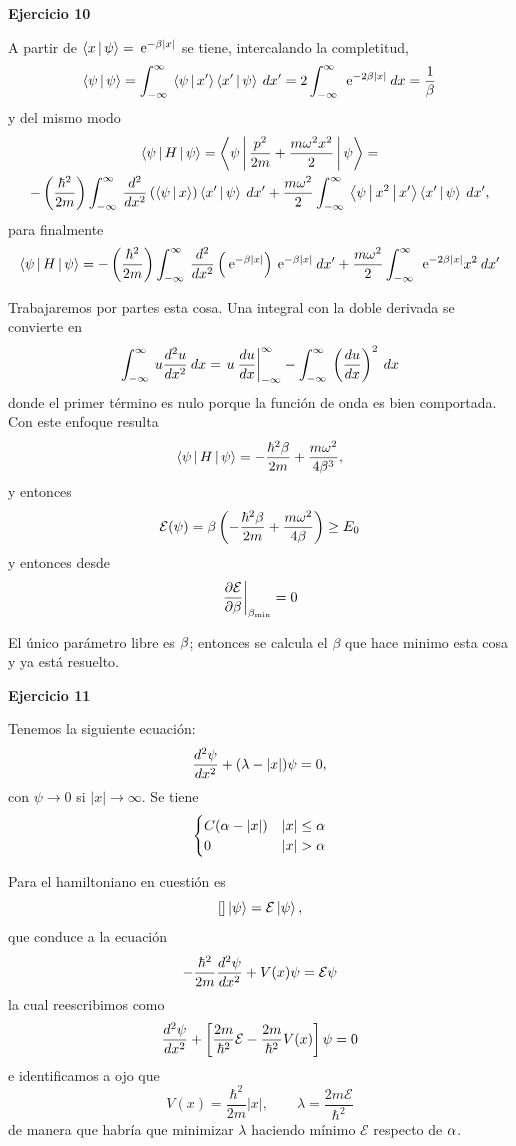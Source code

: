 \documentclass[10pt,oneside]{CBFT_book}
\begin{document}
\begin{ejemplo}{\bf Ejercicio 10}

A partir de $ \Braket{x|\psi} = \euler^{-\b|x|}$ se tiene, intercalando la completitud,
\[
	\Braket{\psi|\psi} = 
	\int_{-\infty}^\infty \: \Braket{\psi | x'}\Braket{x' | \psi} \: dx' = 
	2 \int_{-\infty}^\infty \: \euler^{- 2 \b |x| } \: dx = \frac{1}{\b}
\]
y del mismo modo
\begin{multline*}
	\Braket{\psi|H|\psi} = \Braket{\psi| \frac{p^2}{2 m} + \frac{m \omega^2 x^2 }{2} |\psi} = \\
	- \Frac{\hbar^2}{2m} \int_{-\infty}^\infty \: 
	\dtot[2]{}{x}\left( \Braket{\psi|x} \right)\Braket{x'|\psi} \: dx' +
	\frac{m\omega^2}{2} \int_{-\infty}^\infty \: \Braket{\psi|x^2|x'} \Braket{x'|\psi} \: dx',
\end{multline*}
para finalmente
\[
	\Braket{\psi|H|\psi} = - \Frac{\hbar^2}{2m} \int_{-\infty}^\infty \: 
	\dtot[2]{}{x}\left( \euler^{- \b |x| } \right) \euler^{- \b |x| } \: dx' +
	\frac{m\omega^2}{2} \int_{-\infty}^\infty \: \euler^{- 2 \b |x| } x^2 \: dx'
\]

Trabajaremos por partes esta cosa. Una integral con la doble derivada se convierte en
\[
	\int_{-\infty}^\infty \: u \dtot[2]{u}{x} \: dx = 
	\left. u \: \dtot{u}{x} \right|_{-\infty}^\infty - \int_{-\infty}^\infty \: \Dtot{u}{x}^2 \: dx
\]
donde el primer término es nulo porque la función de onda es bien comportada.
Con este enfoque resulta
\[
	\Braket{\psi|H|\psi} = - \frac{\hbar^2 \b}{2m} + \frac{m\omega^2}{4\b^3},
\]
y entonces 
\[
	\mathcal{E}(\psi) = \b \left( - \frac{\hbar^2 \b}{2m} + \frac{m\omega^2}{4\b} \right) \geq E_0 
\]
y entonces desde
\[
	\left. \dpar{\mathcal E}{\b}\right|_{\b_{\text{min}}} = 0
\]

El único parámetro libre es $\b$; entonces se calcula el $\beta$ que hace minimo esta cosa y ya está
resuelto.
 
\end{ejemplo}

\begin{ejemplo}{\bf Ejercicio 11}

Tenemos la siguiente ecuación:
\[
	\dtot[2]{\psi}{x} + (\lambda -|x|)\psi = 0,
\]
con $\psi \to 0$ si $|x|\to\infty$. Se tiene
\[
	\begin{cases}
	 C(\a - |x|) & |x|\leq \a \\
	 0 & |x| > \a
	\end{cases}
\]

Para el hamiltoniano en cuestión es
\[
	\left[ \right] \Ket{\psi} = \mathcal E \Ket{\psi},
\]
que conduce a la ecuación
\[
	- \frac{\hbar^2}{2m} \dtot[2]{\psi}{x} + V(x)\psi = \mathcal E  \psi
\]
la cual reescribimos como
\[
	\dtot[2]{\psi}{x} + 
	\left[ \frac{2m}{\hbar^2} \mathcal E - \frac{2m}{\hbar^2} V(x) \right] \psi  = 0
\]
e identificamos a ojo que
\[
	V(x) = \frac{\hbar^2}{2m}|x|, \qquad \lambda = \frac{2m\mathcal E}{\hbar^2}
\]
de manera que habría que minimizar $\lambda$ haciendo mínimo $\mathcal E$ respecto de $\a$.
 
\end{ejemplo}
\end{document}

